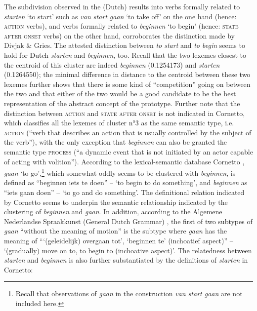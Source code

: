 The subdivision observed in the (Dutch) results into verbs formally related to \textit{starten} `to start' such as \textit{van start gaan} `to take off' on the one hand (hence: \textsc{action} verbs), and verbs formally related to \textit{beginnen} `to begin' (hence: \textsc{state after onset} verbs) on the other hand, corroborates the distinction made by Divjak \& Gries. The attested distinction between \textit{to start} and \textit{to begin} seems to hold for Dutch \textit{starten} and \textit{beginnen}, too. Recall that the two lexemes closest to the centroid of this cluster are indeed \textit{beginnen} (0.1254173) and \textit{starten} (0.1264550); the minimal difference in distance to the centroid between these two lexemes further shows that there is some kind of ``competition'' going on between the two and that either of the two would be a good candidate to be the best representation of the abstract concept of the prototype. Further note that the distinction between \textsc{action} and \textsc{state after onset} is not indicated in Cornetto, which classifies all the lexemes of cluster n°3 as the same semantic type, i.e. \textsc{action} (“verb that describes an action that is usually controlled by the subject of the verb”), with the only exception that \textit{beginnen} can also be granted the semantic type \textsc{process} (“a dynamic event that is not initiated by an actor capable of acting with volition”). According to the lexical-semantic database Cornetto \citep{vossen_cornetto_2008}, \textit{gaan} `to go',\footnote{Recall that observations of \textit{gaan} in the construction \textit{van start gaan} are not included here.} which somewhat oddly seems to be clustered with \textit{beginnen}, is defined as “beginnen iets te doen” -- `to begin to do something', and \textit{beginnen} as “iets gaan doen” -- `to go and do something'. The definitional relation indicated by Cornetto seems to underpin the semantic relationship indicated by the clustering of \textit{beginnen} and \textit{gaan}. In addition, according to the Algemene Nederlandse Spraakkunst (General Dutch Grammar) \citep{haeseryn_algemene_2012}, the first of two subtypes of \textit{gaan} “without the meaning of motion” is the subtype where \textit{gaan} has the meaning of “‘(geleidelijk) overgaan tot’, ‘beginnen te’ (inchoatief aspect)” -- `(gradually) move on to, to begin to (inchoative aspect)'. The relatedness between \textit{starten} and \textit{beginnen} is also further substantiated by the definitions of \textit{starten} in Cornetto: 

